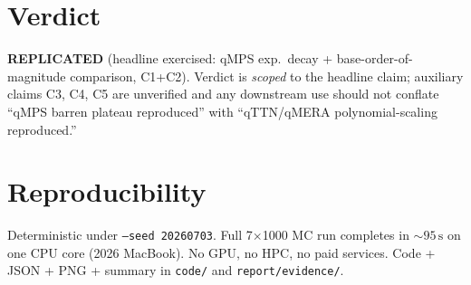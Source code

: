 \documentclass[11pt]{article}
\begin{document}
\section{Verdict}
\textbf{REPLICATED} (headline exercised: qMPS exp.\ decay + base-order-of-magnitude comparison, C1+C2). Verdict is \emph{scoped} to the headline claim; auxiliary claims C3, C4, C5 are unverified and any downstream use should not conflate ``qMPS barren plateau reproduced'' with ``qTTN/qMERA polynomial-scaling reproduced.''



\section*{Reproducibility}
Deterministic under \texttt{--seed 20260703}. Full 7$\times$1000 MC run completes in $\sim 95\,\text{s}$ on one CPU core (2026 MacBook). No GPU, no HPC, no paid services. Code + JSON + PNG + summary in \texttt{code/} and \texttt{report/evidence/}.
\end{document}
